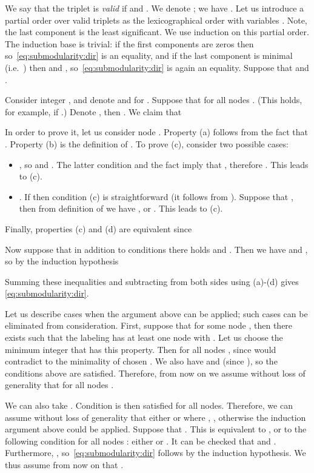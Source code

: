 \documentclass[11pt,onecolumn]{article}
\begin{document}
We say that the triplet  is {\em valid} if  and .
We denote ; we have .
Let us introduce a partial order  over valid triplets as the lexicographical order with variables
. Note, the last component  is the least significant.
We use induction on this partial order. 
The induction base is trivial: if the first  components are zeros then  so~\eqref{eq:submodularity:dir} is an equality,
and if the last component is minimal (i.e.\ ) then  and ,
so~\eqref{eq:submodularity:dir} is again an equality. Suppose that  and . 

Consider integer , and denote  and  for .
Suppose that  for all nodes . (This holds, for example, if .)
Denote , then .
We claim that

In order to prove it, let us consider node . Property (a) follows from the fact that .
Property (b) is the definition of . To prove (c), consider two possible cases:
\begin{itemize}
\item , so  and . The latter condition and the fact
 imply that , therefore . This leads to (c).
\item . If  then condition (c) is straightforward (it follows from ). 
Suppose that , then from definition of  we have , or . This leads to (c).
\end{itemize}
Finally, properties (c) and (d) are equivalent since
\ifICALP

\else

\fi

Now suppose that in addition to conditions  there holds  and . 
Then we have  and , so by the induction hypothesis

Summing these inequalities and subtracting  from both sides using (a)-(d) gives \eqref{eq:submodularity:dir}.

Let us describe cases when the argument above can be applied; such cases can be eliminated from consideration. First, suppose that  for some node ,
then there exists  such that the labeling  has at least one node 
with . Let us choose the minimum integer  that has this property. Then  for all
nodes , since  would contradict to the minimality of chosen . We also have  and 
 (since ), so the conditions above are satisfied. Therefore, from now on we assume without loss of generality
that  for all nodes .


We can also take . Condition  is then satisfied for all nodes. Therefore, we can assume without loss of generality 
that either  or  where , , otherwise the induction argument above could be applied.
Suppose that . This is equivalent to ,
or to the following condition for all nodes : either  or . It can be checked that
 and . Furthermore,
, so~\eqref{eq:submodularity:dir} follows by the induction hypothesis. We thus assume from now on
that .
\end{document}
